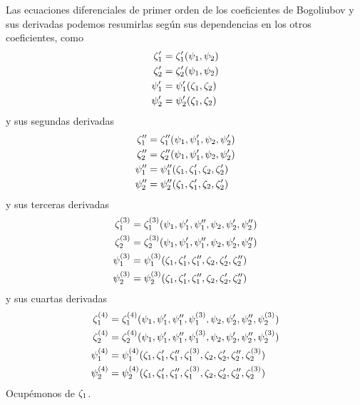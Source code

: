 \documentclass[%
 aip,
 jmp,%
 amsmath,amssymb,
 reprint,%
]{revtex4-2}
\begin{document}
{Las ecuaciones diferenciales de primer orden de los coeficientes de Bogoliubov y sus derivadas podemos resumirlas según sus dependencias en los otros coeficientes, como
\begin{equation}\label{eq:apendice-1}
    \begin{aligned}
        \zeta_1'&=\zeta_1'(\psi_1,\psi_2)\\
        \zeta_2'&=\zeta_2'(\psi_1,\psi_2)\\
        \psi_1'&=\psi_1'(\zeta_1,\zeta_2)\\
        \psi_2'&=\psi_2'(\zeta_1,\zeta_2)
    \end{aligned}
\end{equation}
y sus segundas derivadas
\begin{equation}\label{eq:apendice-2}
    \begin{aligned}
        \zeta_1''&=\zeta_1''(\psi_1,\psi_1',\psi_2,\psi_2')\\
        \zeta_2''&=\zeta_2''(\psi_1,\psi_1',\psi_2,\psi_2')\\
        \psi_1''&=\psi_1''(\zeta_1,\zeta_1',\zeta_2,\zeta_2')\\
        \psi_2''&=\psi_2''(\zeta_1,\zeta_1',\zeta_2,\zeta_2')
    \end{aligned}
\end{equation}
y sus terceras derivadas
\begin{equation}\label{eq:apendice-3}
    \begin{aligned}
        \zeta_1^{(3)}&=\zeta_1^{(3)}(\psi_1,\psi_1',\psi_1'',\psi_2,\psi_2',\psi_2'')\\
        \zeta_2^{(3)}&=\zeta_2^{(3)}(\psi_1,\psi_1',\psi_1'',\psi_2,\psi_2',\psi_2'')\\
        \psi_1^{(3)}&=\psi_1^{(3)}(\zeta_1,\zeta_1',\zeta_1'',\zeta_2,\zeta_2',\zeta_2'')\\
        \psi_2^{(3)}&=\psi_2^{(3)}(\zeta_1,\zeta_1',\zeta_1'',\zeta_2,\zeta_2',\zeta_2'')
    \end{aligned}
\end{equation}
y sus cuartas derivadas
\begin{equation}\label{eq:apendice-4}
    \begin{aligned}
        \zeta_1^{(4)}&=\zeta_1^{(4)}(\psi_1,\psi_1',\psi_1'',\psi_1^{(3)},\psi_2,\psi_2',\psi_2'',\psi_2^{(3)})\\
        \zeta_2^{(4)}&=\zeta_2^{(4)}(\psi_1,\psi_1',\psi_1'',\psi_1^{(3)},\psi_2,\psi_2',\psi_2'',\psi_2^{(3)})\\
        \psi_1^{(4)}&=\psi_1^{(4)}(\zeta_1,\zeta_1',\zeta_1'',\zeta_1^{(3)},\zeta_2,\zeta_2',\zeta_2'',\zeta_2^{(3)})\\
        \psi_2^{(4)}&=\psi_2^{(4)}(\zeta_1,\zeta_1',\zeta_1'',\zeta_1^{(3)},\zeta_2,\zeta_2',\zeta_2'',\zeta_2^{(3)})
    \end{aligned}
\end{equation}
Ocupémonos de $\zeta_1$. 

}
\end{document}
